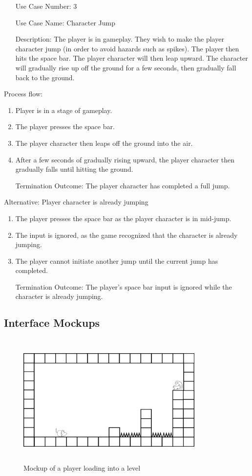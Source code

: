 \documentclass[10pt,conference,onecolumn,compsoc]{IEEEtran}
\begin{document}
\begin{itemize}
\item[Use Case Number:] 3
\item[Use Case Name:] Character Jump
\item[Description:] The player is in gameplay. They wish to make the player character jump (in order to avoid hazards such as spikes). The player then hits the space bar. The player character will then leap upward. The character will gradually rise up off the ground for a few seconds, then gradually fall back to the ground.
\end{itemize}

Process flow:

\begin{enumerate}
\item Player is in a stage of gameplay.
\item The player presses the space bar.
\item The player character then leaps off the ground into the air.
\item After a few seconds of gradually rising upward, the player character then gradually falls until hitting the ground.
\item[Termination Outcome:] The player character has completed a full jump.
\end{enumerate}

Alternative: Player character is already jumping
\begin{enumerate}
\item The player presses the space bar as the player character is in mid-jump.
\item The input is ignored, as the game recognized that the character is already jumping.
\item The player cannot initiate another jump until the current jump has completed.
\item[Termination Outcome:] The player's space bar input is ignored while the character is already jumping.
\end{enumerate}


\subsection{Interface Mockups}
\begin{figure}[ht!]
\includegraphics[height=250px, width=350px]{Level Mockup.png}
\caption{Mockup of a player loading into a level}
\label{Level Mockup.png}
\end{figure}
\end{document}
